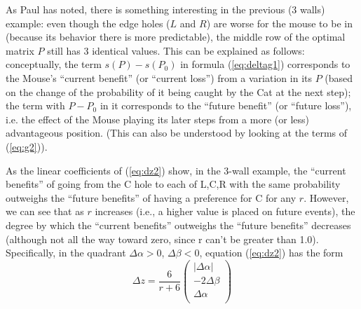 \documentclass[12pt]{article}
\begin{document}
As Paul has noted, there is something interesting in the previous (3 walls) example: even though the edge holes ($L$ and $R$) are worse for the mouse to be in (because its behavior there is more predictable), the middle row of the optimal matrix $P$ still has 3 identical values. This can be explained as follows: conceptually, the term $s(P)  - s(P_0)$ in formula (\ref{eq:deltag1}) corresponds to the Mouse's ``current benefit'' (or ``current loss'') from a variation in its $P$ (based on the change of the probability of it being caught by the Cat at the next step); the term with $P-P_0$ in it corresponds to the ``future benefit'' (or ``future loss''), i.e. the effect of the Mouse playing its later steps from a more (or less) advantageous position. (This can also be understood by looking at the terms of (\ref{eq:g2})).

As the linear coefficients of (\ref{eq:dz2}) show, in the 3-wall example, the ``current benefits'' of going from the C hole to each of L,C,R with the same probability outweighs the ``future benefits'' of having a preference for C for any $r$. However, we can see that as $r$ increases (i.e., a higher value is placed on future events), the degree by which the  ``current benefits'' outweighs the ``future benefits'' decreases (although not all the way toward zero, since r can't be greater than 1.0). Specifically, in the quadrant $\Delta\alpha >0$, $\Delta \beta<0$, equation (\ref{eq:dz2}) has the form
\begin{equation}
\label{eq:dz3}
\Delta z = 
 \frac{6}{r+6} 
\begin{pmatrix}
|\Delta\alpha| \\
- 2\Delta\beta   \\
\Delta\alpha  \\
\end{pmatrix}
\end{equation}



\end{document}
